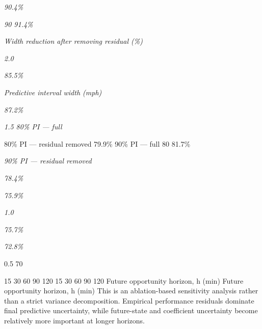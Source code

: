 \begin{center}\textit{90.4\%}\end{center}

\begin{center}\textit{90 91.4\%}\end{center}

\begin{center}\textit{Width reduction after removing residual (\%)}\end{center}

\begin{center}\textit{2.0}\end{center}

\begin{center}\textit{85.5\%}\end{center}

\begin{center}\textit{Predictive interval width (mph)}\end{center}

\begin{center}\textit{87.2\%}\end{center}

\begin{center}\textit{1.5                                                                80\% PI --- full}\end{center}

80\% PI --- residual removed 79.9\% 90\% PI --- full 80 81.7\%

\begin{center}\textit{90\% PI --- residual removed}\end{center}

\begin{center}\textit{78.4\%}\end{center}

\begin{center}\textit{75.9\%}\end{center}

\begin{center}\textit{1.0}\end{center}

\begin{center}\textit{75.7\%}\end{center}

\begin{center}\textit{72.8\%}\end{center}

0.5 70

15 30 60 90 120 15 30 60 90 120 Future opportunity horizon, h (min) Future opportunity horizon, h (min) This is an ablation-based sensitivity analysis rather than a strict variance decomposition. Empirical performance residuals dominate final predictive uncertainty, while future-state and coefficient uncertainty become relatively more important at longer horizons.

